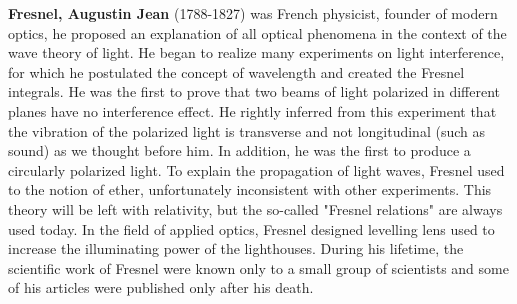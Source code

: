 \textbf{Fresnel, Augustin Jean} (1788-1827) was French physicist, founder of modern optics, he proposed an explanation of all optical phenomena in the context of the wave theory of light. He began to realize many experiments on light interference, for which he postulated the concept of wavelength and created the Fresnel integrals. He was the first to prove that two beams of light polarized in different planes have no interference effect. He rightly inferred from this experiment that the vibration of the polarized light is transverse and not longitudinal (such as sound) as we thought before him. In addition, he was the first to produce a circularly polarized light. To explain the propagation of light waves, Fresnel used to the notion of ether, unfortunately inconsistent with other experiments. This theory will be left with relativity, but the so-called "Fresnel relations" are always used today. In the field of applied optics, Fresnel designed levelling lens used to increase the illuminating power of the lighthouses. During his lifetime, the scientific work of Fresnel were known only to a small group of scientists and some of his articles were published only after his death.


